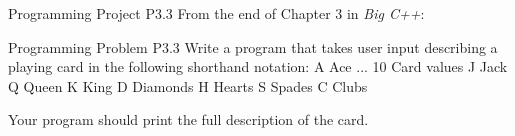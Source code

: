 \documentclass[handout]{beamer}
\begin{document}
\begin{frame}[fragile]{Programming Project P3.3}
    From the end of Chapter 3 in \textit{Big C++}:

    \begin{block}{Programming Problem P3.3}
    Write a program that takes user input describing a playing card in the following shorthand notation:
    \newline A Ace
     ... 10  Card values
    \newline J Jack
    \newline Q Queen
    \newline K King
    \newline D Diamonds
    \newline H Hearts
    \newline S Spades
    \newline C Clubs

    Your program should print the full description of the card. 
    \end{block}
\end{frame}
\end{document}
